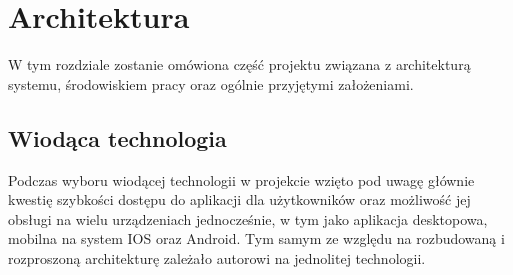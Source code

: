 \chapter{Architektura}
\label{ch:funplenop}

W tym rozdziale zostanie omówiona część projektu związana z architekturą systemu, środowiskiem pracy oraz ogólnie przyjętymi założeniami.

\section{Wiodąca technologia}

Podczas wyboru wiodącej technologii w projekcie wzięto pod uwagę głównie kwestię szybkości dostępu do aplikacji dla użytkowników oraz możliwość jej obsługi na wielu urządzeniach jednocześnie, w tym jako aplikacja desktopowa, mobilna na system IOS oraz Android. Tym samym ze względu na rozbudowaną i rozproszoną architekturę zależało autorowi na jednolitej technologii.

